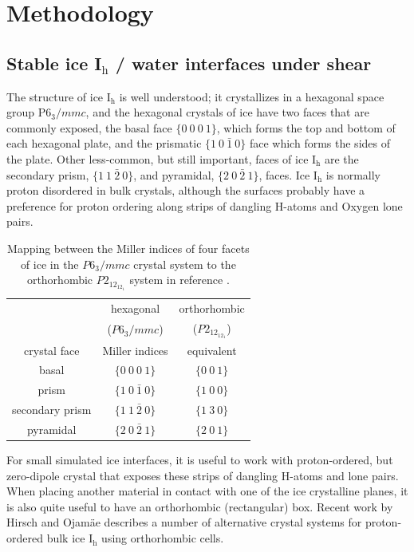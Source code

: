 \section{Methodology}

\subsection{Stable ice I$_\mathrm{h}$ / water interfaces under shear}

The structure of ice I$_\mathrm{h}$ is well understood; it
crystallizes in a hexagonal space group P$6_3/mmc$, and the hexagonal
crystals of ice have two faces that are commonly exposed, the basal
face $\{0~0~0~1\}$, which forms the top and bottom of each hexagonal
plate, and the prismatic $\{1~0~\bar{1}~0\}$ face which forms the
sides of the plate. Other less-common, but still important, faces of
ice I$_\mathrm{h}$ are the secondary prism, $\{1~1~\bar{2}~0\}$, and
pyramidal, $\{2~0~\bar{2}~1\}$, faces.  Ice I$_\mathrm{h}$ is normally
proton disordered in bulk crystals, although the surfaces probably
have a preference for proton ordering along strips of dangling H-atoms
and Oxygen lone pairs.\cite{Buch:2008fk}

\begin{table}[h]
\centering
  \caption{Mapping between the Miller indices of four facets of ice in
    the $P6_3/mmc$ crystal system to the orthorhombic $P2_12_12_1$
    system in reference  \protect\citep{Hirsch04}.}
\label{tab:equiv}
\begin{tabular}{|ccc|} \hline
 & hexagonal & orthorhombic \\
 & ($P6_3/mmc$) & ($P2_12_12_1$) \\
 crystal face  & Miller indices & equivalent \\ \hline
basal & $\{0~0~0~1\}$ & $\{0~0~1\}$ \\
prism & $\{1~0~\bar{1}~0\}$ & $\{1~0~0\}$ \\
secondary prism & $\{1~1~\bar{2}~0\}$ & $\{1~3~0\}$ \\
pyramidal & $\{2~0~\bar{2}~1\}$ & $\{2~0~1\}$ \\ \hline
\end{tabular}
\end{table}
For small simulated ice interfaces, it is useful to work with
proton-ordered, but zero-dipole crystal that exposes these strips of
dangling H-atoms and lone pairs.  When placing another material in
contact with one of the ice crystalline planes, it is also quite
useful to have an orthorhombic (rectangular) box. Recent work by
Hirsch and Ojam\"{a}e describes a number of alternative crystal
systems for proton-ordered bulk ice I$_\mathrm{h}$ using orthorhombic
cells.\cite{Hirsch04}

